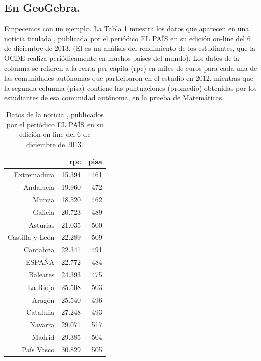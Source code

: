 \documentclass[10pt,a4paper]{article}\usepackage[]{graphicx}\usepackage[]{color}
\newcounter {cont01}
\begin{document}
\subsection{En GeoGebra.}

Empecemos con un ejemplo. La Tabla \ref{tut10:tabla:datosPisaPais} muestra los datos que aparecen en una noticia titulada , publicada por el periódico EL PAÍS en su edición on-line del 6 de diciembre de 2013. (El  es un análisis del rendimiento de los estudiantes, que la OCDE realiza periódicamente en muchos países del mundo). Los  datos de la columna se refieren a la renta per cápita (rpc) en miles de euros para cada una de las comunidades autónomas que participaron en el estudio en 2012, mientras que la segunda columna (pisa) contiene las puntuaciones (promedio) obtenidas por los estudiantes de esa comunidad autónoma, en la prueba de Matemáticas.
\begin{table}[ht]
\centering
\begin{tabular}{rrr}
  \hline
 & rpc & pisa \\
  \hline
  Extremadura & 15.394 & 461 \\
  Andalucía & 19.960 & 472 \\
  Murcia & 18.520 & 462 \\
  Galicia & 20.723 & 489 \\
  Asturias & 21.035 & 500 \\
  Castilla y León & 22.289 & 509 \\
  Cantabria & 22.341 & 491 \\
  ESPAÑA & 22.772 & 484 \\
  Baleares & 24.393 & 475 \\
  La Rioja & 25.508 & 503 \\
  Aragón & 25.540 & 496 \\
  Cataluña & 27.248 & 493 \\
  Navarra & 29.071 & 517 \\
  Madrid & 29.385 & 504 \\
  País Vasco & 30.829 & 505 \\
   \hline
\end{tabular}
\caption{Datos de la noticia , publicados por el periódico EL PAÍS en su edición on-line del 6 de diciembre de 2013.}
\label{tut10:tabla:datosPisaPais}
\end{table}
\end{document}
